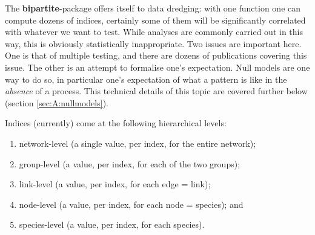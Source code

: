 \documentclass[a4paper, 11pt]{article}
\newcommand{\package}[1]{\textbf{#1}}
\begin{document}
The \package{bipartite}-package offers itself to data dredging: with one function one can compute dozens of indices, certainly some of them will be significantly correlated with whatever we want to test. While analyses are commonly carried out in this way, this is obviously statistically inappropriate. Two issues are important here. One is that of multiple testing, and there are dozens of publications covering this issue. The other is an attempt to formalise one's expectation. Null models are one way to do so, in particular one's expectation of what a pattern is like in the \emph{absence} of a process. This technical details of this topic are covered further below (section \ref{sec:A:nullmodels}). 

Indices (currently) come at the following hierarchical levels:
\begin{enumerate}
\item network-level (a single value, per index, for the entire network);
\item group-level  (a value, per index, for each of the two groups);
\item link-level  (a value, per index, for each edge = link);
\item node-level (a value, per index, for each node = species); and
\item species-level (a value, per index, for each species).
\end{enumerate}
\end{document}
